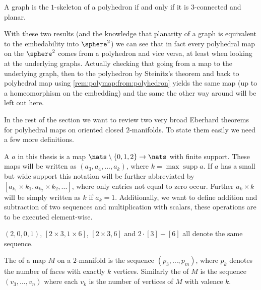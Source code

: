 \begin{theorem} A graph is the $1$-skeleton of a polyhedron if and only if it is $3$-connected and planar.
\end{theorem}

With these two results (and the knowledge that planarity of a graph is equivalent to the embedability into $\sphere^2$) we can see that in fact every polyhedral map on the $\sphere^2$ comes from a polyhedron and vice versa, at least when looking at the underlying graphs. Actually checking that going from a map to the underlying graph, then to the polyhedron by {\sc Steinitz}'s theorem and back to polyhedral map using \autoref{rem:polymap:from:polyhedron} yields the same map (up to a homeomorphism on the embedding) and the same the other way around will be left out here.

In the rest of the section we want to review two very broad {\sc Eberhard} theorems for polyhedral maps on oriented closed $2$-manifolds. To state them easily we need a few more definitions.

\begin{definition}[Sequence]
  A  $a$ in this thesis is a map $\nats \setminus \{0, 1, 2\} \rightarrow \nats$ with finite support. These maps will be written as $(a_3, a_4, ..., a_k)$, where $k = \operatorname{max} \operatorname{supp} a$. If $a$ has a small but wide support this notation will be further abbreviated by $[a_{k_1} \times k_1, a_{k_2} \times k_2, ...]$, where only entries not equal to zero occur. Further $a_k \times k$ will be simply written as $k$ if $a_k = 1$. Additionally, we want to define addition and subtraction of two sequences and multiplication with scalars, these operations are to be executed element-wise.
\end{definition}
\begin{example}
  $(2, 0, 0, 1)$, $[2 \times 3, 1 \times 6]$, $[2 \times 3, 6]$ and $2 \cdot [3] + [6]$ all denote the same sequence.
\end{example}
\begin{definition}\label{def:relizable}
  The  of a map $M$ on a $2$-manifold is the sequence $(p_3, \dots, p_m)$, where $p_k$ denotes the number of faces with exactly $k$ vertices. Similarly the  of $M$ is the sequence $(v_3, \dots, v_n)$ where each $v_k$ is the number of vertices of $M$ with valence $k$.
\end{definition}


